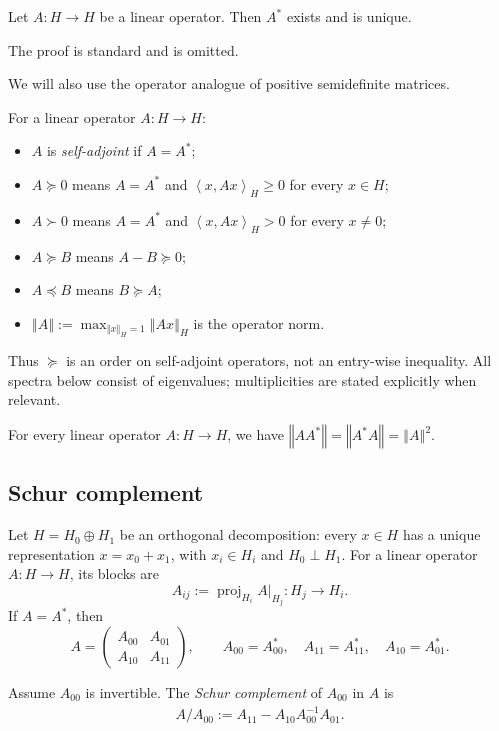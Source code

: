 \documentclass[a4paper,12pt]{article}
\theoremstyle{plain}
\theoremstyle{definition}
\newcommand{\norm}[1]{\left\Vert#1\right\Vert}
\newcommand{\inner}[2]{\left\langle #1,#2\right\rangle}
\begin{document}
\begin{proposition}
  Let $A:H\to H$ be a linear operator.
  Then $A^*$ exists and is unique.
\end{proposition}
The proof is standard and is omitted.

We will also use the operator analogue of positive semidefinite matrices.
\begin{definition}
  For a linear operator $A:H\to H$:
  \begin{itemize}
  \item $A$ is \emph{self-adjoint} if $A=A^*$;
  \item $A\succeq0$ means $A=A^*$ and
    $\inner{x}{Ax}_H\geq0$ for every $x\in H$;
  \item $A\succ0$ means $A=A^*$ and
    $\inner{x}{Ax}_H>0$ for every $x\neq0$;
  \item $A\succeq B$ means $A-B\succeq0$;
  \item $A\preceq B$ means $B\succeq A$;
  \item $\norm{A}:=\max_{\norm{x}_H=1}\norm{Ax}_H$ is the operator norm.
  \end{itemize}
  Thus $\succeq$ is an order on self-adjoint operators, not an entry-wise
  inequality.  All spectra below consist of eigenvalues; multiplicities are
  stated explicitly when relevant.
\end{definition}

\begin{fact}
  For every linear operator $A:H\to H$, we have
  $\norm{AA^*} = \norm{A^*A} = \norm{A}^2$.
\end{fact}

\subsection{Schur complement}
Let $H=H_0\oplus H_1$ be an orthogonal decomposition: every $x\in H$ has a
unique representation $x=x_0+x_1$, with $x_i\in H_i$ and $H_0\perp H_1$.
For a linear operator $A:H\to H$, its blocks are
\[
  A_{ij}:=\operatorname{proj}_{H_i}A|_{H_j}:H_j\longrightarrow H_i.
\]
If $A=A^*$, then
\[
  A=
  \begin{pmatrix}
    A_{00}&A_{01}\\
    A_{10}&A_{11}
  \end{pmatrix},
  \qquad
  A_{00}=A_{00}^*,\quad A_{11}=A_{11}^*,\quad A_{10}=A_{01}^*.
\]

\begin{definition}
Assume $A_{00}$ is invertible.
The \emph{Schur complement} of $A_{00}$ in $A$ is
\begin{align} \label{eq:abstract-Schur-complement}
  A/A_{00}
  :=A_{11}-A_{10}A_{00}^{-1}A_{01}.
\end{align}
\end{definition}
\end{document}
